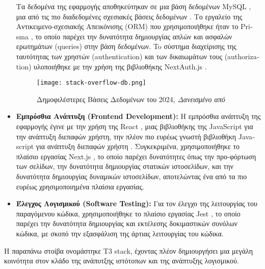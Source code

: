 \begin{itemize}
  Τα δεδομένα της εφαρμογής αποθηκεύτηκαν σε μια βάση δεδομένων
  \textlatin{MySQL} \cite{mysql}, μια από τις πιο διαδεδομένες σχεσιακές
  βάσεις δεδομένων \cite{so2024}. Tο εργαλείο της Αντικειμενο-σχεσιακής
  Απεικόνισης \textlatin{(ORM)} που χρησιμοποιήθηκε ήταν το
  \textlatin{Prisma} \cite{prisma}, το οποίο παρέχει την δυνατότητα
  δημιουργίας απλών και ασφαλών ερωτημάτων \textlatin{(queries)} στην
  βάση δεδομένων. To σύστημα διαχείρισης της ταυτότητας των χρηστών
  \textlatin{(authentication)} και των δικαιωμάτων τους
  \textlatin{(authorization)} υλοποιήθηκε με την χρήση της βιβλιοθήκης
  \textlatin{NextAuth.js} \cite{nextauth}.
  \begin{figure}[H]
    \begin{center}
      \texttt{[image: stack-overflow-db.png]}
      \caption{Δημοφιλέστερες Βάσεις Δεδομένων του 2024,
        \textit{Δανεισμένο από \cite{so2024}}}
    \end{center}
    \label{fig:SO2024DB}
  \end{figure}
\item
  \textbf{Εμπρόσθια Ανάπτυξη (\textlatin{Frontend Development}):} Η
  εμπρόσθια ανάπτυξη της εφαρμογής έγινε με την χρήση της
  \textlatin{React} \cite{react}, μιας βιβλιοθήκης της
  \textlatin{JavaScript} για την ανάπτυξη διεπαφών χρήστη, την πλέον πιο
  ευρέως γνωστή βιβλιοθήκη \textlatin{Javascript} για ανάπτυξη διεπαφών
  χρήστη \cite{so2024}. Συγκεκριμένα, χρησιμοποιήθηκε το πλαίσιο
  εργασίας \textlatin{Next.js} \cite{nextjs}, το οποίο παρέχει
  δυνατότητες όπως την προ-φόρτωση των σελίδων, την δυνατότητα
  δημιουργίας στατικών ιστοσελίδων, και την δυνατότητα δημιουργίας
  δυναμικών ιστοσελίδων, αποτελώντας ένα από τα πιο ευρέως
  χρησιμοποιημένα πλαίσια εργασίας.
\item
  \textbf{Έλεγχος Λογισμικού (\textlatin{Software Testing}):} Για τον
  έλεγχο της λειτουργίας του παραγόμενου κώδικα, χρησιμοποιήθηκε το
  πλαίσιο εργασίας \textlatin{Jest} \cite{jest}, το οποίο παρέχει την
  δυνατότητα δημιουργίας και εκτέλεσης δοκιμαστικών συνόλων κώδικα, με
  σκοπό την εξασφάλιση της άρτιας λειτουργίας του κώδικα.
  \cite{Jacobson1999,irena2008,swebok2004,miller1981,shaw1990}
\end{itemize}

Η παραπάνω στοίβα ονομάστηκε \textlatin{T3 stack}, έχοντας πλέον
δημιουργήσει μια μεγάλη κοινότητα στον κλάδο της ανάπυτξης ιστότοπων και
της ανάπτυξης λογισμικού. \cite{t3repo}

